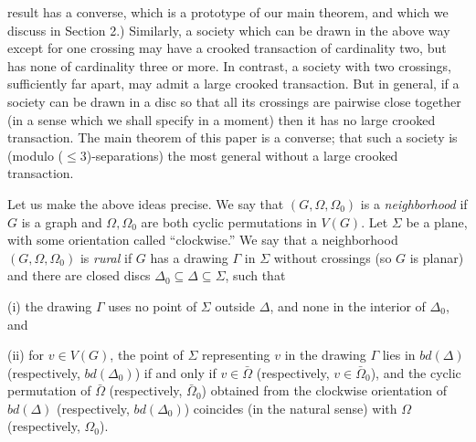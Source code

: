 \noindent result has a converse, which is a prototype of our main theorem, and which we discuss in Section 2.) Similarly, a society which can be drawn in the above way except for one crossing may have a crooked transaction of cardinality two, but has none of cardinality three or more. In contrast, a society with two crossings, sufficiently far apart, may admit a large crooked transaction. But in general, if a society can be drawn in a disc so that all its crossings are pairwise close together (in a sense which we shall specify in a moment) then it has no large crooked transaction. The main theorem of this paper is a converse; that such a society is (modulo ($\le 3$)-separations) the most general without a large crooked transaction.

Let us make the above ideas precise. We say that $(G, \Omega, \Omega_0)$ is a \textit{neighborhood} if $G$ is a graph and $\Omega, \Omega_0$ are both cyclic permutations in $V(G)$. Let $\Sigma$ be a plane, with some orientation called ``clockwise.'' We say that a neighborhood $(G, \Omega, \Omega_0)$ is \textit{rural} if $G$ has a drawing $\Gamma$ in $\Sigma$ without crossings (so $G$ is planar) and there are closed discs $\Delta_0 \subseteq \Delta \subseteq \Sigma$, such that

\hspace*{12pt}(i) the drawing $\Gamma$ uses no point of $\Sigma$ outside $\Delta$, and none in the interior of $\Delta_0$, and

\hspace*{12pt}(ii) for $v \in V(G)$, the point of $\Sigma$ representing $v$ in the drawing $\Gamma$ lies in $bd(\Delta)$ (respectively, $bd(\Delta_0)$) if and only if $v \in \bar{\Omega}$ (respectively, $v \in \bar{\Omega}_0$), and the cyclic permutation of $\bar{\Omega}$ (respectively, $\bar{\Omega}_0$) obtained from the clockwise orientation of $bd(\Delta)$ (respectively, $bd(\Delta_0)$) coincides (in the natural sense) with $\Omega$ (respectively, $\Omega_0$).

